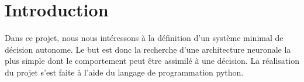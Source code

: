 \section*{Introduction}

Dans ce projet, nous nous intéressons à la définition d'un système minimal de décision autonome.
Le but est donc la recherche d'une architecture neuronale la plus simple dont le comportement peut être assimilé à une décision.
La réalisation du projet s'est faite à l'aide du langage de programmation python.


